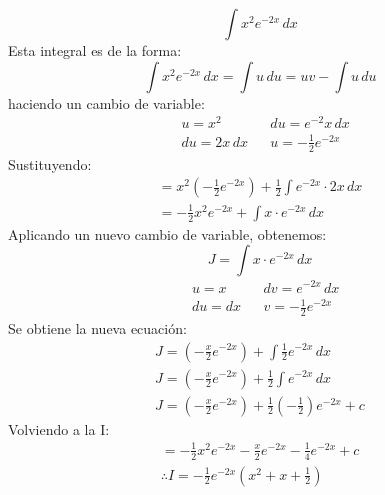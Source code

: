 \begin{problem}
    \begin{equation}
        \int x^2e^{- 2x} \, dx
    \end{equation}
Esta integral es de la forma:
\begin{equation*}
    \int x^2e^{- 2x} \, dx = \int u\,du = uv -\int u\, du
\end{equation*}
haciendo un cambio de variable:
\begin{align*}
    &u = x^2&& du = e^{ - 2}x\,dx\\
    &du = 2x\,dx&& u = - \frac{1}{2}e^{ - 2x}
\end{align*}
Sustituyendo: 
\begin{align*}
    = x^2\left( - \frac{1}{2}e^{ -2x} \right) + \frac{1}{2} \int e^{- 2x}\cdot 2x\,dx\\
    = - \frac{1}{2}x^2e^{ - 2x} +\int x\cdot e^{- 2x}\,dx
\end{align*}
Aplicando un nuevo cambio de variable, obtenemos:
\begin{equation*}
    J = \int x \cdot e^{- 2x}\, dx
\end{equation*}
\begin{align*}
    &u = x&& dv = e^{ - 2x}\, dx\\
    &du = dx&& v = - \frac{1}{2}e^{- 2x}
\end{align*}
Se obtiene la nueva ecuación:
\begin{align*}
    J = \left( - \frac{x}{2}e^{- 2x} \right) + \int \frac{1}{2}e^{ - 2x}\, dx\\
    J = \left( - \frac{x}{2}e^{ - 2x} \right) + \frac{1}{2}\int e^{ - 2x}\, dx\\
    J =\left( - \frac{x}{2}e^{- 2x}\right) + \frac{1}{2}\left(- \frac{1}{2}\right)e^{- 2x} + c
\end{align*}
Volviendo a la I:
\begin{align*}
    = - \frac{1}{2}x^2e^{- 2x} - \frac{x}{2}e^{ - 2x} - \frac{1}{4} e^{ - 2x} + c\\
    \therefore I = -\frac{1}{2}e^{ - 2x}\left(x^2 + x + \frac{1}{2} \right)
\end{align*}
\end{problem}




